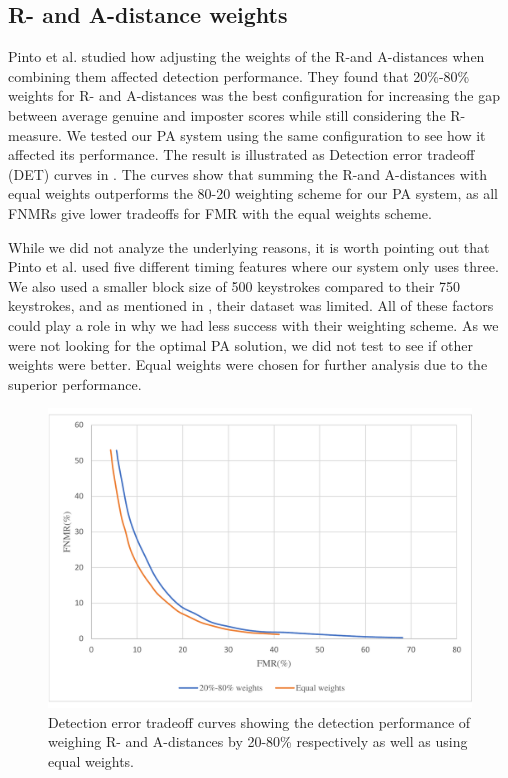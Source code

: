 \subsection{R- and A-distance weights}
Pinto et al. \cite{Pinto2014} studied how adjusting the weights of the R-and A-distances when combining them affected detection performance.
They found that 20\%-80\% weights for R- and A-distances was the best configuration for increasing the gap between average genuine and imposter scores while still considering the R-measure.
We tested our PA system using the same configuration to see how it affected its performance.
The result is illustrated as Detection error tradeoff (DET) curves in .
The curves show that summing the R-and A-distances with equal weights outperforms the 80-20 weighting scheme for our PA system, as all FNMRs give lower tradeoffs for FMR with the equal weights scheme.

While we did not analyze the underlying reasons, it is worth pointing out that Pinto et al. used five different timing features where our system only uses three.
We also used a smaller block size of 500 keystrokes compared to their 750 keystrokes, and as mentioned in , their dataset was limited.
All of these factors could play a role in why we had less success with their weighting scheme.
As we were not looking for the optimal PA solution, we did not test to see if other weights were better. 
Equal weights were chosen for further analysis due to the superior performance.

\begin{figure}[ht]
    \centering
    \includegraphics[width=1\textwidth]{figures/weights.pdf}
    \caption{Detection error tradeoff curves showing the detection performance of weighing R- and A-distances by 20-80\% respectively as well as using equal weights. }
    \label{fig:RAweights}
\end{figure}


